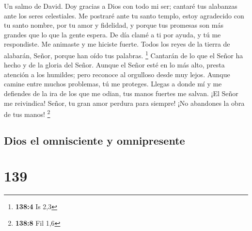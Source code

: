 Un salmo de David.  Doy gracias a Dios con todo mi ser;
cantaré tus alabanzas ante los seres celestiales.  Me
postraré ante tu santo templo, estoy agradecido con tu santo nombre, por
tu amor y fidelidad, y porque tus promesas son más grandes que lo que la
gente espera.  De día clamé a ti por ayuda, y tú me
respondiste. Me animaste y me hiciste fuerte.  Todos los
reyes de la tierra de alabarán, Señor, porque han oído tus palabras.
\footnote{\textbf{138:4} Is 2,3}  Cantarán de lo que el
Señor ha hecho y de la gloria del Señor.  Aunque el Señor
esté en lo más alto, presta atención a los humildes; pero reconoce al
orgulloso desde muy lejos.  Aunque camine entre muchos
problemas, tú me proteges. Llegas a donde mí y me defiendes de la ira de
los que me odian, tus manos fuertes me salvan.  ¡El Señor me
reivindica! Señor, tu gran amor perdura para siempre! ¡No abandones la
obra de tus manos! \footnote{\textbf{138:8} Fil 1,6}

\hypertarget{dios-el-omnisciente-y-omnipresente}{%
\subsection{Dios el omnisciente y
omnipresente}\label{dios-el-omnisciente-y-omnipresente}}

\hypertarget{section-138}{%
\section{139}\label{section-138}}

